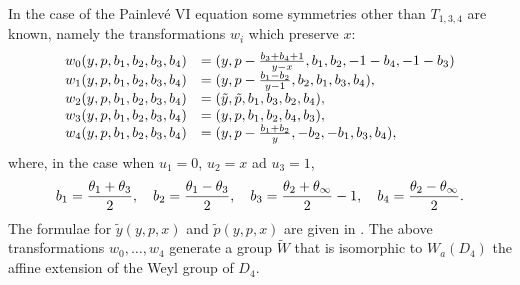 \documentclass[12pt]{article}
\theoremstyle{definition}
\theoremstyle{theorem}
\begin{document}
In the case of the Painlev\'e VI equation some symmetries
other than $T_{1,3,4}$ are known, namely the transformations 
$w_i$ which preserve $x$:
$$
\begin{array}{cl}
w_0(y,p,b_1, b_2, b_3, b_4)&=
(y,p-{b_3+b_4+1\over y-x},b_1,b_2,-1-b_4,-1-b_3)\\
w_1(y,p,b_1, b_2, b_3, b_4)&=(y,p-{b_1-b_2\over y-1},b_2, b_1, b_3, b_4),\\
w_2(y,p,b_1, b_2, b_3, b_4)&=(\tilde y,\tilde p,b_1, b_3, b_2, b_4),\\
w_3(y,p,b_1, b_2, b_3, b_4)&=(y,p,b_1, b_2, b_4, b_3),\\
w_4(y,p,b_1, b_2, b_3, b_4)&=(y,p-{b_1+b_2\over y},-b_2,-b_1,b_3,b_4),\\
\end{array}
$$
where, in the case when $u_1=0$, $u_2=x$ ad $u_3=1$,
$$
b_1={\theta_1+\theta_3\over 2},\quad
b_2={\theta_1-\theta_3\over 2},\quad
b_3={\theta_2+\theta_\infty\over 2}-1,\quad
b_4={\theta_2-\theta_\infty\over 2}.
$$ 
The formulae for $\tilde y(y,p,x)$ and $\tilde p(y,p,x)$ are given in 
\cite{Ok2}. The above transformations $w_0,\dots,w_4$ generate a group 
$\tilde W$ that is isomorphic to $W_a(D_4)$ the affine extension of
the Weyl group of $D_4$. 
\end{document}
